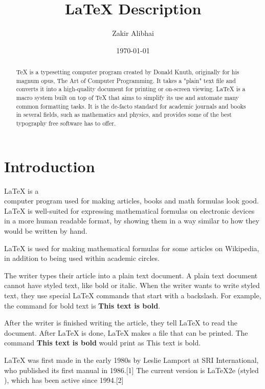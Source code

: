 \documentclass[letterpaper,notitlepage,11pt]{article}
\begin{document}
\title{LaTeX Description}
\author{Zakir Alibhai}
\date{\today}
\maketitle
\begin{abstract}
TeX is a typesetting computer program created by Donald Knuth, originally for his magnum opus, The Art of Computer Programming. It takes a "plain" text file and converts it into a high-quality document for printing or on-screen viewing. LaTeX is a macro system built on top of TeX that aims to simplify its use and automate many common formatting tasks. It is the de-facto standard for academic journals and books in several fields, such as mathematics and physics, and provides some of the best typography free software has to offer.
\end{abstract}
\section{Introduction}
LaTeX is a \\ computer program used for \break making articles, books and math formulas look good. LaTeX is \hfil\break well-suited for expressing mathematical formulas on electronic devices in a more human readable format, by showing them in a way similar to how they would be written by hand.

LaTeX is used \hfil\break for making mathematical formulas for some articles on Wikipedia, in addition to being used within academic circles.

The writer types their article into a plain text document. A plain text document cannot have styled text, like bold or italic. When the writer wants to write styled text, they use special LaTeX commands that start with a backslash. For example, the command for bold text is \textbf{This text is bold}.

After the writer is finished writing the article, they tell LaTeX to read the document. After LaTeX is done, LaTeX makes a file that can be printed. The command \textbf{This text is bold} would print as This text is bold.

LaTeX was first made in the early 1980s by Leslie Lamport at SRI International, who published its first manual in 1986.[1] The current version is LaTeX2e (styled \LaTeXe), which has been active since 1994.[2]
\end{document}
